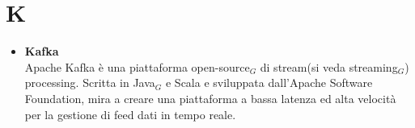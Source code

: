 \chapter{K} \label{K}
\begin{itemize}
	\item \textbf{Kafka}\\
	Apache Kafka è una piattaforma open-source$_G$ di stream(si veda streaming$_G$) processing. Scritta in Java$_G$ e
	Scala e sviluppata dall’Apache Software Foundation, mira a creare una piattaforma a bassa
	latenza ed alta velocità per la gestione di feed dati in tempo reale.
	
\end{itemize}
